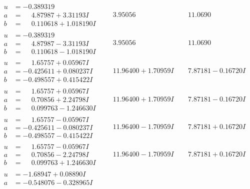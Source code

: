 \documentclass[1p]{elsarticle_modified}
\theoremstyle{definition}
\begin{document}
$$\begin{array}{c|c|c}
\begin{aligned}
u &= -0.389319\phantom{ +0.000000I} \\
a &= \phantom{-}4.87987 + 3.31193 I \\
b &= \phantom{-}0.110618 + 1.018190 I\end{aligned}
 & \phantom{-}3.95056\phantom{ +0.000000I} & \phantom{-}11.0690\phantom{ +0.000000I} \\ \hline\begin{aligned}
u &= -0.389319\phantom{ +0.000000I} \\
a &= \phantom{-}4.87987 - 3.31193 I \\
b &= \phantom{-}0.110618 - 1.018190 I\end{aligned}
 & \phantom{-}3.95056\phantom{ +0.000000I} & \phantom{-}11.0690\phantom{ +0.000000I} \\ \hline\begin{aligned}
u &= \phantom{-}1.65757 + 0.05967 I \\
a &= -0.425611 + 0.080237 I \\
b &= -0.498557 + 0.415422 I\end{aligned}
 & \phantom{-}11.96400 + 1.70959 I & \phantom{-}7.87181 - 0.16720 I \\ \hline\begin{aligned}
u &= \phantom{-}1.65757 + 0.05967 I \\
a &= \phantom{-}0.70856 + 2.24798 I \\
b &= \phantom{-}0.099763 - 1.246630 I\end{aligned}
 & \phantom{-}11.96400 + 1.70959 I & \phantom{-}7.87181 - 0.16720 I \\ \hline\begin{aligned}
u &= \phantom{-}1.65757 - 0.05967 I \\
a &= -0.425611 - 0.080237 I \\
b &= -0.498557 - 0.415422 I\end{aligned}
 & \phantom{-}11.96400 - 1.70959 I & \phantom{-}7.87181 + 0.16720 I \\ \hline\begin{aligned}
u &= \phantom{-}1.65757 - 0.05967 I \\
a &= \phantom{-}0.70856 - 2.24798 I \\
b &= \phantom{-}0.099763 + 1.246630 I\end{aligned}
 & \phantom{-}11.96400 - 1.70959 I & \phantom{-}7.87181 + 0.16720 I \\ \hline\begin{aligned}
u &= -1.68947 + 0.08890 I \\
a &= -0.548076 - 0.328965 I \\

\end{aligned}
\end{array}$$
\end{document}
